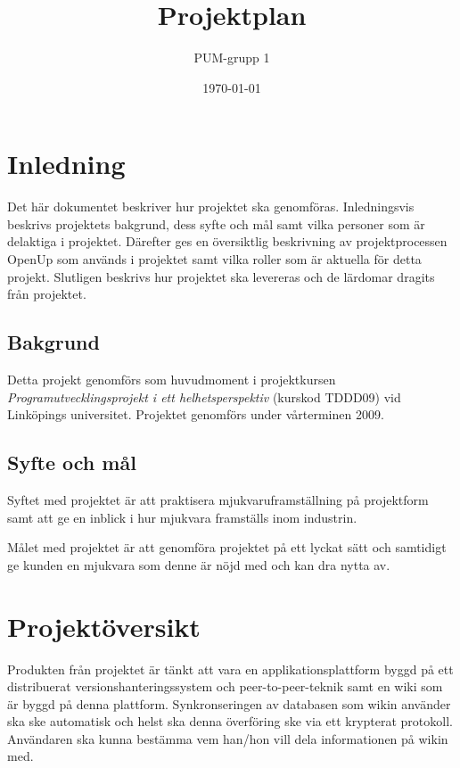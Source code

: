 

\ifpdf
\else
\fi

\title{Projektplan}
\author{PUM-grupp 1}
\date{\today}



\maketitle\thispagestyle{empty}

\newpage

\section{Inledning}
Det här dokumentet beskriver hur projektet ska genomföras. Inledningsvis beskrivs projektets bakgrund, dess syfte och mål samt vilka personer som är delaktiga i projektet. Därefter ges en översiktlig beskrivning av projektprocessen OpenUp som används i projektet samt vilka roller som är aktuella för detta projekt. Slutligen beskrivs hur projektet ska levereras och de lärdomar dragits från projektet.

\subsection{Bakgrund}
Detta projekt genomförs som huvudmoment i projektkursen \textit{Programutvecklingsprojekt i ett helhetsperspektiv} (kurskod TDDD09) vid Linköpings universitet. Projektet genomförs under vårterminen 2009.

\subsection{Syfte och mål}
Syftet med projektet är att praktisera mjukvaruframställning på projektform samt att ge en inblick i hur mjukvara framställs inom industrin.

Målet med projektet är att genomföra projektet på ett lyckat sätt och samtidigt ge kunden en mjukvara som denne är nöjd med och kan dra nytta av.

\section{Projektöversikt}
Produkten från projektet är tänkt att vara en applikationsplattform byggd på ett distribuerat versionshanteringssystem och peer-to-peer-teknik samt en wiki som är byggd på denna plattform. Synkronseringen av databasen som wikin använder ska ske automatisk och helst ska denna överföring ske via ett krypterat protokoll. Användaren ska kunna bestämma vem han/hon vill dela informationen på wikin med.

